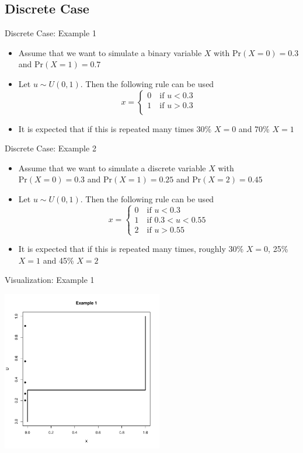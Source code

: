\documentclass
[handout]
{beamer}
\begin{document}
\subsection{Discrete Case}
\begin{frame}{Discrete Case: Example 1}
\begin{itemize}
\item Assume that we want to simulate a binary variable $X$ with $\mbox{Pr}(X=0)=0.3$ and $\mbox{Pr}(X=1)=0.7$
\pause
\item Let $u\sim U(0,1)$.  Then the following rule can be used
\begin{equation}
x=\left\{\begin{array}{c}
0 \quad \mbox{if $u<0.3$}\\
1 \quad \mbox{if $u>0.3$}\\
\end{array}
\right.
\end{equation}
\pause
\item It is expected that if this is repeated many times 30\% $X=0$ and 70\% $X=1$
\end{itemize}
\end{frame}
\begin{frame}{Discrete Case: Example 2}
\begin{itemize}
\item Assume that we want to simulate a discrete variable $X$ with $\mbox{Pr}(X=0)=0.3$ and $\mbox{Pr}(X=1)=0.25$ and $\mbox{Pr}(X=2)=0.45$
\pause
\item Let $u\sim U(0,1)$.  Then the following rule can be used
\begin{equation}
x=\left\{\begin{array}{l}
0 \quad \mbox{if $u<0.3$}\\
1 \quad \mbox{if $0.3<u<0.55$}\\
2 \quad \mbox{if $u>0.55$}
\end{array}
\right.
\end{equation}
\pause
\item It is expected that if this is repeated many times, roughly 30\% $X=0$, 25\% $X=1$ and  45\% $X=2$
\end{itemize}
\end{frame}
\begin{frame}{Visualization: Example 1}
\begin{center}
\includegraphics[height=7cm]{./Pics/d1p1.pdf}
\end{center}
\end{frame}
\end{document}
